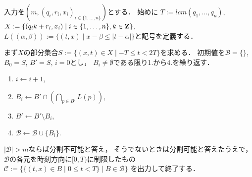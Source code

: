 


\begin{greedyAlgorithmForTimeSpecifiedProblemOnLine}
  入力を$(m, (q_i, r_i, x_i)_{ i \in \{ 1, \ldots, n \} })$とする．
  始めに
  $T := lcm(q_1, \ldots, q_n)$,
  $X := \{ (q_i k + r_i, x_i) \mid i \in \{1, \ldots, n\}, k \in \mathbf Z \}$,
  $L((\alpha, \beta)) := \{(t, x) \mid x - \beta \leq |t - \alpha| \}$と記号を定義する．

  まず$X$の部分集合$S := \{ (x, t) \in X \mid -T \leq t < 2T \}$を求める．
  初期値を$\mathcal{B} = \{\}$, $B_0 = S$, $B' = S$, $i = 0$とし，
  $B_i \neq \emptyset$である限り1.から4.を繰り返す．
  \begin{enumerate}
    \item $i \gets i + 1$, 
    \item $B_i \gets B' \cap \left( \bigcap_{p \in B'} L(p) \right)$, 
    \item $B' \gets B' \setminus B_i$, 
    \item $\mathcal{B} \gets \mathcal{B} \cup \{ B_i \}$.
  \end{enumerate}

  $|\mathcal{B}| > m$ならば分割不可能と答え，
  そうでないときは分割可能と答えたうえで，
  $\mathcal{B}$の各元を時刻方向に$[0, T)$に制限したもの
  $\mathcal{C} := \{ \{ (t, x) \in B \mid 0 \leq t < T \} \mid B \in \mathcal{B} \}$
  を出力して終了する．
\end{greedyAlgorithmForTimeSpecifiedProblemOnLine}

